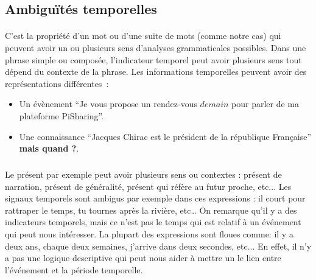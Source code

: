 \documentclass[12pt,a4	]{report}
\begin{document}
\subsection{Ambiguïtés temporelles}
\paragraph{}
C'est la propriété d'un mot ou d'une suite de mots (comme notre cas) qui peuvent avoir un ou plusieurs sens d'analyses grammaticales possibles. Dans une phrase simple ou composée, l'indicateur temporel peut avoir plusieurs sens tout dépend du contexte de la phrase.
\newline
Les informations temporelles peuvent avoir des représentations différentes~: 
\begin{itemize}
\item Un évènement ``Je vous propose un rendez-vous $demain$ pour parler de ma plateforme PiSharing''. \item Une connaissance ``Jacques Chirac est le président de la république Française'' \textbf{ mais quand ?}.
\end{itemize}

\subparagraph{} 
Le présent par exemple peut avoir plusieurs sens ou contextes : présent de narration, présent de généralité, présent qui réfère au futur proche, etc...
Les signaux temporels sont ambigus par exemple dans ces expressions : il court pour rattraper le temps, tu tournes après la rivière, etc… On remarque qu'il y a des indicateurs temporels, mais ce n'est pas le temps qui est relatif à un événement qui peut nous intéresser.
La plupart des expressions sont floues comme: il y a deux ans, chaque deux semaines, j’arrive dans deux secondes, etc... En effet, il n'y a pas une logique descriptive qui peut nous aider à mettre un le lien entre l'événement et la période temporelle.
\end{document}
